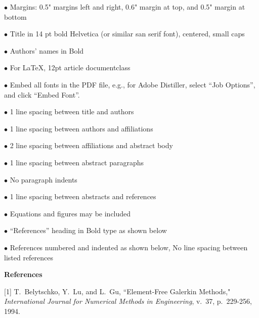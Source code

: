 \documentclass[12pt]{article}
\begin{document}
$\bullet$ Margins: 0.5" margins left and right, 0.6" margin 
at top, and 0.5" margin at bottom

$\bullet$ Title in 14 pt bold Helvetica (or similar san serif font), centered,
small caps

$\bullet$ Authors' names in Bold

$\bullet$ For LaTeX, 12pt article documentclass

$\bullet$ Embed all fonts in the PDF file, e.g., for Adobe
Distiller, select ``Job Options'', and click ``Embed Font''.

$\bullet$ 1 line spacing between title and authors

$\bullet$ 1 line spacing between authors and affiliations

$\bullet$ 2 line spacing between affiliations and abstract body

$\bullet$ 1 line spacing between abstract paragraphs

$\bullet$ No paragraph indents

$\bullet$ 1 line spacing between abstracts and references

$\bullet$ Equations and figures may be included

$\bullet$ ``References'' heading in Bold type as shown below

$\bullet$ References numbered and indented as shown below, No line
spacing between listed references


\vspace{12pt}

\parindent=0pt
{\bf References}

[1] T.~Belytschko, Y.~Lu, and L.~Gu, ``Element-Free 
Galerkin Methods," {\it International Journal for Numerical Methods in
Engineering\/}, v.~37, p.~229-256, 1994.
\end{document}
